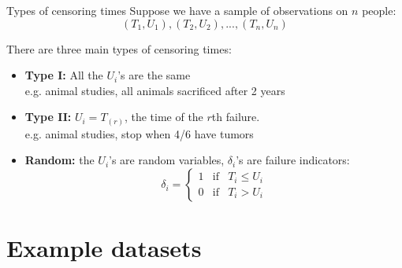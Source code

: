 \documentclass[envcountsect, 10pt, portrait, palatino]{beamer}
\begin{document}
\begin{frame}{Types of censoring times}
Suppose we have a sample of observations on $n$ people:
$$(T_1,U_1), (T_2,U_2),..., (T_n,U_n)$$

There are three main types of censoring times:
\begin{itemize}
\item {\bf Type I:}  All the $U_i$'s are the same \\
e.g. animal studies, all animals sacrificed after 2 years \\
\item {\bf Type II:}  $U_i = T_{(r)} $, the time of the $r$th failure.\\
e.g. animal studies, stop when 4/6 have tumors\\
\item  {\bf Random:} the $U_i$'s are random variables, $\delta_i$'s are
failure indicators:
\[\delta_i=\left\{\begin{array}{ccc}
1 & \mbox{if} & T_i\le U_i\\
0 & \mbox{if} & T_i>U_i
\end{array} \right. \]
\end{itemize}
\end{frame}
\section{Example datasets}
\end{document}
